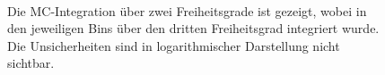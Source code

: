 \begin{figure}
	\centering
	 \\
	\caption{Die MC-Integration über zwei Freiheitsgrade ist gezeigt, wobei in den jeweiligen Bins über den dritten Freiheitsgrad integriert wurde. Die Unsicherheiten sind in logarithmischer Darstellung nicht sichtbar.}
	\label{MC-Int-Hadron}
\end{figure}
